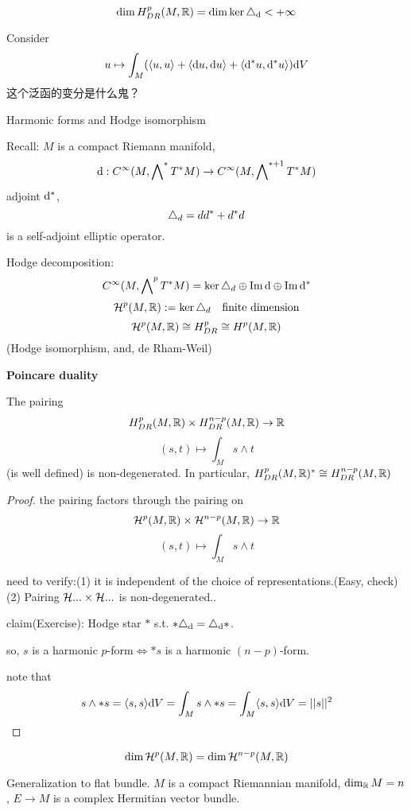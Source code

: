 \begin{cor}
$$\dim H^{p}_{DR}(M,\mathbb{R})=\dim\ker\triangle_{\mathrm{d}}<+\infty$$
\end{cor}

\begin{rem}Consider
$$u\mapsto \int_M(
  \langle u,u \rangle+
  \langle \mathrm{d} u,\mathrm{d} u \rangle+
  \langle \mathrm{d}^*u,\mathrm{d}^*u \rangle
)\mathrm{d} V$$
这个泛函的变分是什么鬼？
\end{rem}

Harmonic forms and Hodge isomorphism

Recall: $M$ is a compact Riemann manifold,
$$\mathrm{d}:C^\infty(M,\bigwedge\nolimits^{*}T^*M)\to C^\infty(M,\bigwedge\nolimits^{*+1}T^*M)$$
adjoint $\mathrm{d}^*$,
$$\triangle_d=dd^*+d^*d$$
is a self-adjoint elliptic operator.

Hodge decomposition:
$$C^\infty(M,\bigwedge\nolimits^{p}T^*M)=\ker\triangle_d\oplus\operatorname{Im} \mathrm{d}\oplus\operatorname{Im}\mathrm{d}^*$$
$$\mathcal{H}^p(M,\mathbb{R}):=\ker\triangle_d \quad\text{finite dimension}$$
$$\mathcal{H}^p(M,\mathbb{R})\cong H^p_{DR}\cong H^p(M,\mathbb{R})$$
(Hodge isomorphism, and, de Rham-Weil)

\textbf{Poincare duality}

\begin{thm}
The pairing
$$H^p_{DR}(M,\mathbb{R})\times H^{n-p}_{DR}(M,\mathbb{R})\to\mathbb{R}$$
$$(s,t)\mapsto\int_M s\wedge t$$
(is well defined) is non-degenerated. In particular,
$H^p_{DR}(M,\mathbb{R})^*\cong H^{n-p}_{DR}(M,\mathbb{R})$
\end{thm}

\begin{proof}
the pairing factors through the pairing on
$$\mathcal{H}^p(M,\mathbb{R})\times\mathcal{H}^{n-p}(M,\mathbb{R})\to\mathbb{R}$$
$$(s,t)\mapsto\int_Ms\wedge t$$

need to verify:(1)
it is independent of the choice of representations.(Easy, check)
(2) Pairing $\mathcal{H}...\times\mathcal{H}...$ is non-degenerated..

claim(Exercise): Hodge star $*$ s.t. $*\triangle_{\mathrm{d}}=\triangle_{\mathrm{d}}*$.

so, $s$ is a harmonic $p$-form$\iff *s$ is a harmonic $(n-p)$-form.

note that
$$s\wedge *s=\langle s,s\rangle \mathrm{d} V
=\int_Ms\wedge *s=\int_M\langle s,s\rangle\mathrm{d} V=||s||^2
$$
\end{proof}

\begin{cor}
$$\dim\mathcal{H}^p(M,\mathbb{R})=\dim\mathcal{H}^{n-p}(M,\mathbb{R})$$
\end{cor}

Generalization to flat bundle. $M$ is a compact Riemannian manifold,
$\dim_{\mathbb{R}}M=n$, $E\to M$ is a complex Hermitian vector bundle.

